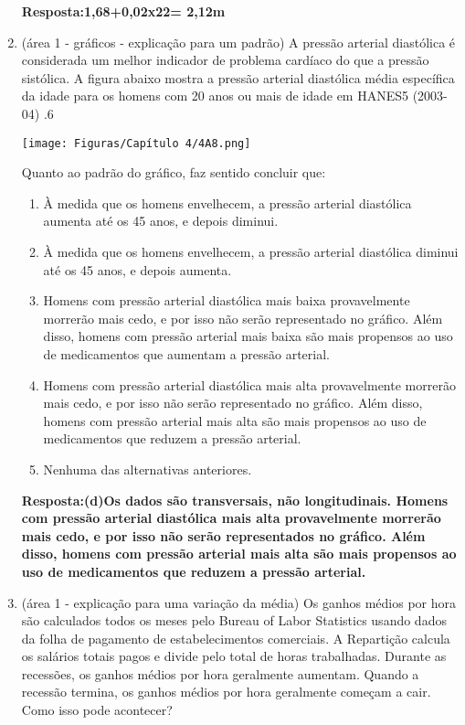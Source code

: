 \documentclass[12pt]{article}\documentclass[brazilian,12pt,a4paper,final]{article}
\begin{document}
\begin{enumerate}
\textbf{Resposta:1,68+0,02x22= 2,12m }

\item(área 1 - gráficos - explicação para um padrão) A pressão arterial diastólica é considerada um melhor indicador de problema cardíaco do que a pressão sistólica. A figura abaixo mostra a pressão arterial diastólica média específica da idade para os homens com 20 anos ou mais de idade em HANES5 (2003-04) .6

\texttt{[image: Figuras/Capítulo 4/4A8.png]}

Quanto ao padrão do gráfico, faz sentido concluir que:
\begin{enumerate}
    \item À medida que os homens envelhecem, a pressão arterial diastólica aumenta até os 45 anos, e depois diminui.
    \item À medida que os homens envelhecem, a pressão arterial diastólica diminui até os 45 anos, e depois aumenta.
    \item Homens com pressão arterial diastólica mais baixa provavelmente morrerão mais cedo, e por isso não serão
representado no gráfico. Além disso, homens com pressão arterial mais baixa são mais propensos ao uso de medicamentos que aumentam a pressão arterial. 
    \item Homens com pressão arterial diastólica mais alta provavelmente morrerão mais cedo, e por isso não serão
representado no gráfico. Além disso, homens com pressão arterial mais alta são mais propensos ao uso de medicamentos que reduzem a pressão arterial. 
    \item Nenhuma das alternativas anteriores.

\end{enumerate}

\textbf{Resposta:(d)Os dados são transversais, não longitudinais. Homens com pressão arterial diastólica mais alta provavelmente morrerão mais cedo, e por isso não serão
representados no gráfico. Além disso, homens com pressão arterial mais alta são mais
propensos ao uso de medicamentos que reduzem a pressão arterial.}


\item (área 1 - explicação para uma variação da média) Os ganhos médios por hora são calculados todos os meses pelo Bureau of Labor Statistics usando dados da folha de pagamento de estabelecimentos comerciais. A Repartição calcula os
salários totais pagos e divide pelo total de horas
trabalhadas. Durante as recessões, os ganhos médios por hora geralmente aumentam. Quando a recessão termina, os ganhos médios por hora geralmente começam a cair. Como isso pode acontecer?


\end{enumerate}
\end{document}
